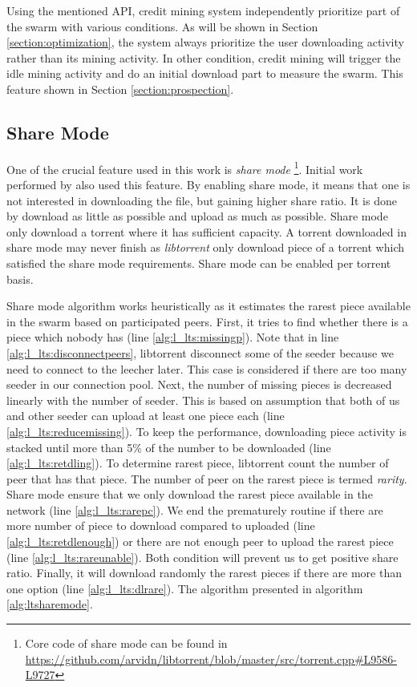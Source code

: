 Using the mentioned API, credit mining system independently prioritize part of the swarm with various conditions. As will be shown in Section \ref{section:optimization}, the system always prioritize the user downloading activity rather than its mining activity. In other condition, credit mining will trigger the idle mining activity and do an initial download part to measure the swarm. This feature shown in Section \ref{section:prospection}. 

\subsection{Share Mode}
\label{section:sharemode}
One of the crucial feature used in this work is \textit{share mode} \footnote{Core code of share mode can be found in \url{https://github.com/arvidn/libtorrent/blob/master/src/torrent.cpp\#L9586-L9727}}. Initial work performed by \citeauthor{2015:creditmining:capota} also used this feature\cite{2015:creditmining:capota}. By enabling share mode, it means that one is not interested in downloading the file, but gaining higher share ratio. It is done by download as little as possible and upload as much as possible. Share mode only download a torrent where it has sufficient capacity. A torrent downloaded in share mode may never finish as \textit{libtorrent} only download piece of a torrent which satisfied the share mode requirements. Share mode can be enabled per torrent basis.

Share mode algorithm works heuristically as it estimates the rarest piece available in the swarm based on participated peers. First, it tries to find whether there is a piece which nobody has (line \ref{alg:l_lts:missingp}). Note that in line \ref{alg:l_lts:disconnectpeers}, libtorrent disconnect some of the seeder because we need to connect to the leecher later. This case is considered if there are too many seeder in our connection pool. Next, the number of missing pieces is decreased linearly with the number of seeder. This is based on assumption that both of us and other seeder can upload at least one piece each (line \ref{alg:l_lts:reducemissing}). To keep the performance, downloading piece activity is stacked until more than 5\% of the number to be downloaded (line \ref{alg:l_lts:retdling}). To determine rarest piece, libtorrent count the number of peer that has that piece. The number of peer on the rarest piece is termed \textit{rarity}. Share mode ensure that we only download the rarest piece available in the network (line \ref{alg:l_lts:rarepc}). We end the prematurely routine if there are more number of piece to download compared to uploaded (line \ref{alg:l_lts:retdlenough}) or there are not enough peer to upload the rarest piece (line \ref{alg:l_lts:rareunable}). Both condition will prevent us to get positive share ratio. Finally, it will download randomly the rarest pieces if there are more than one option (line \ref{alg:l_lts:dlrare}). The algorithm presented in algorithm \ref{alg:ltsharemode}. 

